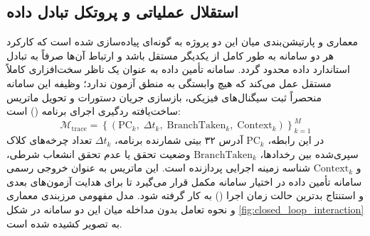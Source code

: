 \subsection{استقلال عملیاتی و پروتکل تبادل داده}
معماری و پارتیشن‌بندی میان این دو پروژه به گونه‌ای پیاده‌سازی شده است که کارکرد هر دو سامانه به طور کامل از یکدیگر مستقل باشد و ارتباط آن‌ها صرفاً به تبادل استاندارد داده محدود گردد. سامانه تأمین داده به عنوان یک ناظر سخت‌افزاری کاملاً مستقل عمل می‌کند که هیچ وابستگی به منطق آزمون ندارد؛ وظیفه این سامانه منحصراً ثبت سیگنال‌های فیزیکی، بازسازی جریان دستورات و تحویل ماتریس ساخت‌یافته ردگیری اجرای برنامه () است:
\begin{equation}
\label{eq:trace_matrix}
\mathcal{M}_{\mathrm{trace}} = \left\{ \left( \mathrm{PC}_k, \; \Delta t_k, \; \mathrm{BranchTaken}_k, \; \mathrm{Context}_k \right) \right\}_{k=1}^{M}
\end{equation}
در این رابطه، $\mathrm{PC}_k$ آدرس ۳۲ بیتی شمارنده برنامه، $\Delta t_k$ تعداد چرخه‌های کلاک سپری‌شده بین رخدادها، $\mathrm{BranchTaken}_k$ وضعیت تحقق یا عدم تحقق انشعاب شرطی، و $\mathrm{Context}_k$ شناسه زمینه اجرایی پردازنده است. این ماتریس به عنوان خروجی رسمی سامانه تأمین داده در اختیار سامانه مکمل قرار می‌گیرد تا برای هدایت آزمون‌های بعدی و استنتاج بدترین حالت زمان اجرا () به کار گرفته شود. مدل مفهومی مرزبندی معماری و نحوه تعامل بدون مداخله میان این دو سامانه در شکل \ref{fig:closed_loop_interaction} به تصویر کشیده شده است.

